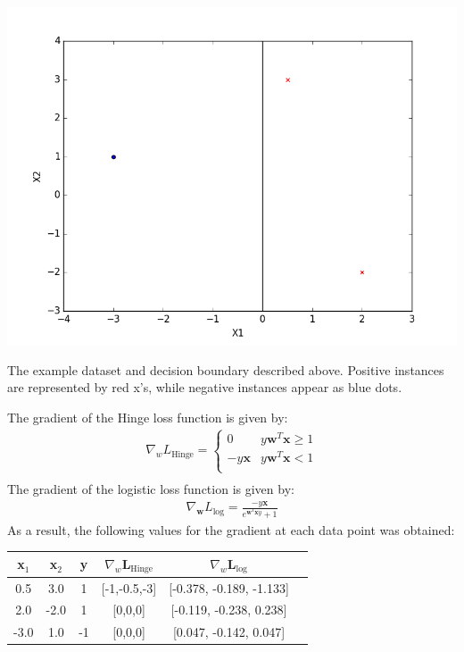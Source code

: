 \begin{center}
  \includegraphics[width=.8\textwidth]{./images/SimpleDatasetWithDecisionBoundary.png}
\end{center}
\begin{small}
  The example dataset and decision boundary described above. Positive instances are
  represented by red x's, while negative instances appear as blue dots.
\end{small}

\begin{solution}
  The gradient of the Hinge loss function is given by:
  \begin{eqnarray*}
		\nabla_w L_{\text{Hinge}} = \begin{cases} 
		0 & y\textbf{w}^T\textbf{x} \geq 1 \\
		-y\textbf{x} & y\textbf{w}^T\textbf{x} < 1 \\ 
		\end{cases}\\
		\end{eqnarray*} 
  The gradient of the logistic loss function is given by:
  \begin{eqnarray*}
		\nabla_\textbf{w} L_{\text{log}} = \frac{-y\textbf{x}}{e^{\textbf{w}^{T}\textbf{x}y} + 1}
	\end{eqnarray*}
  As a result, the following values for the gradient at each data point was obtained:
  \begin{center}
    \begin{tabular}{|c| c|c|c|c|c|} 
      x$_1$ & x$_2$ & y & $\nabla_w$L$_{\text{Hinge}}$  & $\nabla_w$L$_{\text{log}}$ \\ 
      \hline
      0.5 & 3.0 & 1 & [-1,-0.5,-3] & [-0.378, -0.189, -1.133] \\ 
      2.0 & -2.0 & 1 & [0,0,0] & [-0.119, -0.238, 0.238] \\
      -3.0 & 1.0 & -1 & [0,0,0] & [0.047, -0.142, 0.047]\\
    \end{tabular}
  \end{center} 
\end{solution}

